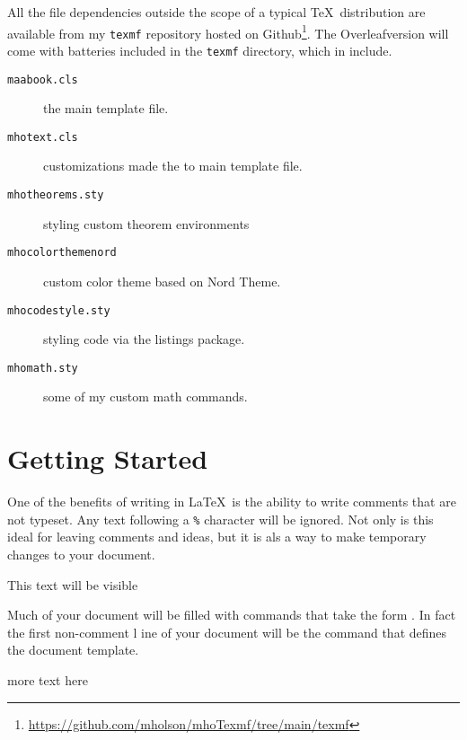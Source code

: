 All the file dependencies outside the scope of a typical \TeX\, distribution
are available from my \texttt{texmf} repository hosted on
Github\footnote{\url{https://github.com/mholson/mhoTexmf/tree/main/texmf}}.
The Overleaf\texttrademark version will come with batteries included in the 
\texttt{texmf} directory, which in include.  
\begin{description}
    \item[\texttt{maabook.cls}] the main template file.
    \item[\texttt{mhotext.cls}] customizations made the to main template file.
    \item[\texttt{mhotheorems.sty}] styling custom theorem environments
    \item[\texttt{mhocolorthemenord}] custom color theme based on Nord Theme.
    \item[\texttt{mhocodestyle.sty}] styling code via the listings package.
    \item[\texttt{mhomath.sty}] some of my custom math commands.  
\end{description}


\section{Getting Started}

One of the benefits of writing in \LaTeX\, is the ability to write comments
that are not typeset.  Any text following a \verb!%! character will be 
ignored.  Not only is this ideal for leaving comments and ideas, but it is 
als a way to make temporary changes to your document.
\begin{mhotexbox}
This text will be visible %
\end{mhotexbox}
Much of your document will be filled with commands that take the form 
. In fact the first non-comment l
ine of your document will be the command that defines the document template.
more text here

